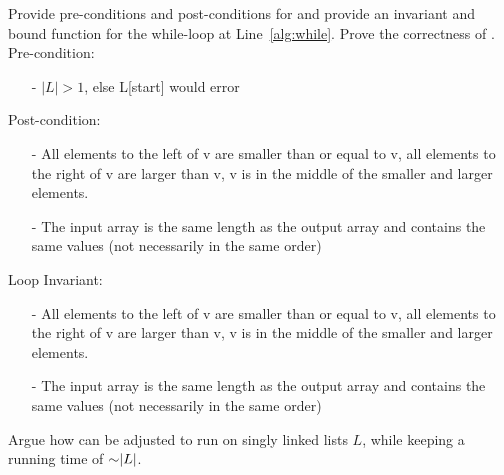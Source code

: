 \begin{problem}
\begin{questions}


    \item Provide pre-conditions and post-conditions for  and provide an invariant and bound function for the while-loop at Line~\ref*{alg:while}. Prove the correctness of .\\
Pre-condition:
\begin{enumerate}
    \item[-] $|L| > 1$, else L[start] would error
\end{enumerate}
Post-condition:
\begin{enumerate}
    \item[-] All elements to the left of v are smaller than or equal to v, all elements to the right of v are larger than v, v is in the middle of the smaller and larger elements.
    \item[-] The input array is the same length as the output array and contains the same values (not necessarily in the same order)
\end{enumerate}
Loop Invariant:
\begin{enumerate}
    \item[-] All elements to the left of v are smaller than or equal to v, all elements to the right of v are larger than v, v is in the middle of the smaller and larger elements.
    \item[-] The input array is the same length as the output array and contains the same values (not necessarily in the same order)
\end{enumerate}

    \item Argue how  can be adjusted to run on singly linked lists $L$, while keeping a running time of $\mathord{\sim}\lvert L \rvert$.
\end{questions}
\end{problem}

